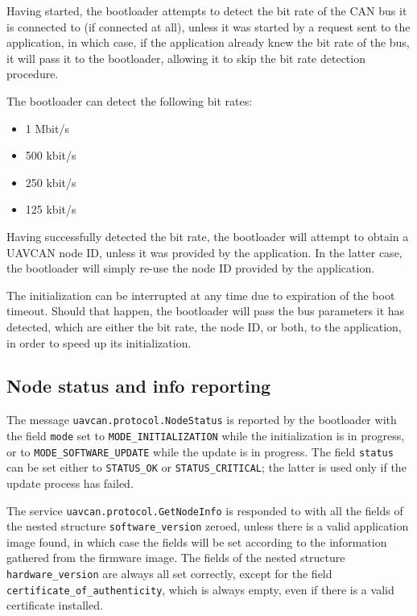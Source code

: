 \documentclass{zubaxdoc}
\begin{document}
Having started, the bootloader attempts to detect the bit rate of the CAN bus it is connected to
(if connected at all), unless it was started by a request sent to the application, in which case,
if the application already knew the bit rate of the bus, it will pass it to the bootloader,
allowing it to skip the bit rate detection procedure.

The bootloader can detect the following bit rates:
\begin{itemize}
	\item 1 Mbit/s
	\item 500 kbit/s
	\item 250 kbit/s
	\item 125 kbit/s
\end{itemize}

Having successfully detected the bit rate, the bootloader will attempt to obtain a UAVCAN node ID,
unless it was provided by the application.
In the latter case, the bootloader will simply re-use the node ID provided by the application.

The initialization can be interrupted at any time due to expiration of the boot timeout.
Should that happen, the bootloader will pass the bus parameters it has detected,
which are either the bit rate, the node ID, or both, to the application,
in order to speed up its initialization.

\subsection{Node status and info reporting}

The message \verb|uavcan.protocol.NodeStatus| is reported by the bootloader with the field
\verb|mode| set to \verb|MODE_INITIALIZATION| while the initialization is in progress,
or to \verb|MODE_SOFTWARE_UPDATE| while the update is in progress.
The field \verb|status| can be set either to \verb|STATUS_OK| or \verb|STATUS_CRITICAL|;
the latter is used only if the update process has failed.

The service \verb|uavcan.protocol.GetNodeInfo| is responded to with all the fields of the nested structure
\verb|software_version| zeroed, unless there is a valid application image found,
in which case the fields will be set according to the information gathered from the firmware image.
The fields of the nested structure \verb|hardware_version| are always all set correctly,
except for the field \verb|certificate_of_authenticity|, which is always empty, even if there is
a valid certificate installed.
\end{document}

